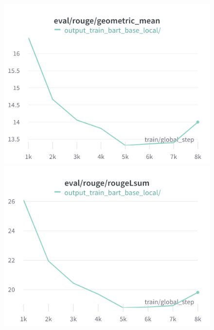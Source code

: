 \begin{figure}[!htb]
\includegraphics[width=\linewidth]{wandb/charts/Section-6-Panel-0-5w7pojrrj}
\caption{}
\endminipage\hfill
{}
\includegraphics[width=\linewidth]{wandb/charts/Section-6-Panel-1-u7oototqm}
\caption{}
\endminipage
\end{figure}

